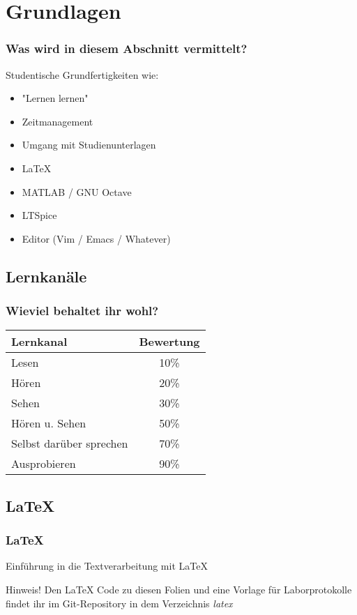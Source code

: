 \documentclass[german,ignorenonframetext]{beamer} %
\begin{document}
\section{Grundlagen}
\begin{frame}
\frametitle{Was wird in diesem Abschnitt vermittelt?}

Studentische Grundfertigkeiten wie:
\begin{itemize}
\item "Lernen lernen"
\item Zeitmanagement
\item Umgang mit Studienunterlagen
\item \LaTeX
\item MATLAB / GNU Octave
\item LTSpice
\item Editor (Vim / Emacs / Whatever)
\end{itemize}
\end{frame}

\subsection{Lernkanäle}
\begin{frame}
\frametitle{Wieviel behaltet ihr wohl?}
\begin{center}
\begin{tabular}{ | l | c | }
\hline
\textbf{Lernkanal} & \textbf{Bewertung} \\ \hline
Lesen & 10\% \\ \hline
Hören & 20\% \\ \hline
Sehen & 30\% \\ \hline
Hören u. Sehen & 50\% \\ \hline
Selbst darüber sprechen & 70\% \\ \hline
Ausprobieren & 90\% \\ \hline
\end{tabular}
\end{center}
\end{frame}

\subsection{LaTeX}
\begin{frame}
\frametitle{LaTeX}

Einführung in die Textverarbeitung mit LaTeX\\

\pause
\begin{block}{Hinweis!}
Den LaTeX Code zu diesen Folien und eine Vorlage für Laborprotokolle findet ihr im Git-Repository in dem Verzeichnis \textit{latex}
\end{block}
\end{frame}
\end{document}
